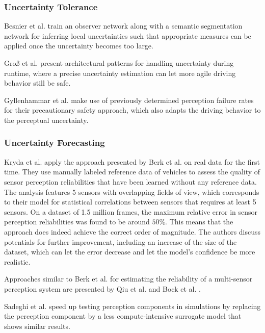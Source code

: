 \documentclass[conference]{IEEEtran}
\newcommand{\citeold}[1]{{\hypersetup{citecolor=black}\cite{#1}}}
\begin{document}
\subsubsection{Uncertainty Tolerance}
\label{sec:uncertainty_tolerance}

Besnier et al. \cite{Besnier2021uncertainty} train an observer network along with a semantic segmentation network for inferring local uncertainties such that appropriate measures can be applied once the uncertainty becomes too large.

Groß et al. \cite{Gross2022architectural} present architectural patterns for handling uncertainty during runtime, where a precise uncertainty estimation can let more agile driving behavior still be safe.

Gyllenhammar et al. \cite{Gyllenhammar2022uncertainty} make use of previously determined perception failure rates for their precautionary safety approach, which also adapts the driving behavior to the perceptual uncertainty. 


\subsubsection{Uncertainty Forecasting}
\label{sec:uncertainty_forecasting}

Kryda et al. \cite{Kryda2021} apply the approach presented by Berk et al. \citeold{berk2019exploiting} on real data for the first time. 
They use manually labeled reference data of vehicles to assess the quality of sensor perception reliabilities that have been learned without any reference data. 
The analysis features 5 sensors with overlapping fields of view, which corresponds to their model for statistical correlations between sensors that requires at least 5 sensors.
On a dataset of 1.5 million frames, the maximum relative error in sensor perception reliabilities was found to be around $50\%$.
This means that the approach does indeed achieve the correct order of magnitude. 
The authors discuss potentials for further improvement, including an increase of the size of the dataset, which can let the error decrease and let the model's confidence be more realistic. 



Approaches similar to Berk et al. \citeold{berk2019exploiting} for estimating the reliability of a multi-sensor perception system are presented by Qiu et al. \cite{Qiu2021reliability} and Bock et al. \cite{Bock2018reliability}.

Sadeghi et al. \cite{Sadeghi2021surrogate} speed up testing perception components in simulations by replacing the perception component by a less compute-intensive surrogate model that shows similar results. 
\end{document}
